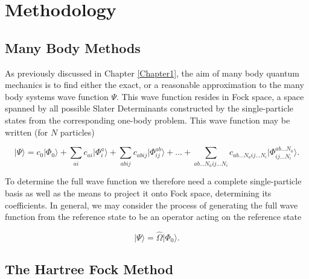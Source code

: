 
\chapter{Methodology} %

\label{Chapter4} %



\section{Many Body Methods}

As previously discussed in Chapter \ref{Chapter1}, the aim of many body quantum mechanics is to find either the exact, or a reasonable approximation to the many body systems wave function $\Psi$. This wave function resides in Fock space, a space spanned by all possible Slater Determinants constructed by the single-particle states from the corresponding one-body problem. This wave function may be written (for $N$ particles)

\begin{equation}
\vert \Psi \rangle = c_0 \vert \Phi_0 \rangle + \sum_{ai} c_{ai }\vert \Phi_i^a \rangle +  \sum_{abij} c_{abij} \vert \Phi_{ij}^{ab} \rangle + ... + \sum_{ab...N_a ij...N_i} c_{ab...N_a ij...N_i} \vert \Phi_{ij...N_i}^{ab...N_a} \rangle.
\label{eqn:fullCI}
\end{equation}

To determine the full wave function we therefore need a complete single-particle basis as well as the means to project it onto Fock space, determining its coefficients. In general, we may consider the process of generating the full wave function from the reference state to be an operator acting on the reference state

\begin{equation}
\vert \Psi \rangle = \hat{\Omega} \vert \Phi_0 \rangle .
\label{eqn:reference_operator}
\end{equation}

\section{The Hartree Fock Method}

